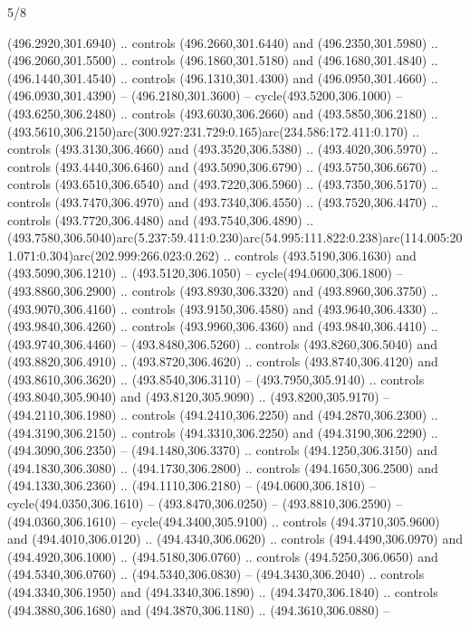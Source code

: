 \begin{flagdescription}{5/8}
\begin{scope}[xshift=0.5\flaglength,yshift=0.5\flagwidth,scale=\flagwidth/475.63]
\begin{scope}[y=0.8pt, x=0.8pt, yscale=-1, xscale=1,shift={(-450,-300)}]
\begin{scope}[cm={{1.0,0.0,0.0,1.0,(-0.0002,0.12556)}},cm={{1.0,0.0,0.0,1.0,(0.00179,0.0)}}]
\begin{scope}[cm={{1.11592,0.0,0.0,1.11592,(-106.89933,-41.77764)}}]
\begin{scope}[draw=black,fill=cfff]
\begin{scope}[fill=black]
  (496.2920,301.6940) .. controls (496.2660,301.6440) and (496.2350,301.5980) ..
  (496.2060,301.5500) .. controls (496.1860,301.5180) and (496.1680,301.4840) ..
  (496.1440,301.4540) .. controls (496.1310,301.4300) and (496.0950,301.4660) ..
  (496.0930,301.4390) -- (496.2180,301.3600) -- cycle(493.5200,306.1000) --
  (493.6250,306.2480) .. controls (493.6030,306.2660) and (493.5850,306.2180) ..
  (493.5610,306.2150)arc(300.927:231.729:0.165)arc(234.586:172.411:0.170) ..
  controls (493.3130,306.4660) and (493.3520,306.5380) .. (493.4020,306.5970) ..
  controls (493.4440,306.6460) and (493.5090,306.6790) .. (493.5750,306.6670) ..
  controls (493.6510,306.6540) and (493.7220,306.5960) .. (493.7350,306.5170) ..
  controls (493.7470,306.4970) and (493.7340,306.4550) .. (493.7520,306.4470) ..
  controls (493.7720,306.4480) and (493.7540,306.4890) ..
  (493.7580,306.5040)arc(5.237:59.411:0.230)arc(54.995:111.822:0.238)arc(114.005:201.071:0.304)arc(202.999:266.023:0.262)
  .. controls (493.5190,306.1630) and (493.5090,306.1210) .. (493.5120,306.1050)
  -- cycle(494.0600,306.1800) -- (493.8860,306.2900) .. controls
  (493.8930,306.3320) and (493.8960,306.3750) .. (493.9070,306.4160) .. controls
  (493.9150,306.4580) and (493.9640,306.4330) .. (493.9840,306.4260) .. controls
  (493.9960,306.4360) and (493.9840,306.4410) .. (493.9740,306.4460) --
  (493.8480,306.5260) .. controls (493.8260,306.5040) and (493.8820,306.4910) ..
  (493.8720,306.4620) .. controls (493.8740,306.4120) and (493.8610,306.3620) ..
  (493.8540,306.3110) -- (493.7950,305.9140) .. controls (493.8040,305.9040) and
  (493.8120,305.9090) .. (493.8200,305.9170) -- (494.2110,306.1980) .. controls
  (494.2410,306.2250) and (494.2870,306.2300) .. (494.3190,306.2150) .. controls
  (494.3310,306.2250) and (494.3190,306.2290) .. (494.3090,306.2350) --
  (494.1480,306.3370) .. controls (494.1250,306.3150) and (494.1830,306.3080) ..
  (494.1730,306.2800) .. controls (494.1650,306.2500) and (494.1330,306.2360) ..
  (494.1110,306.2180) -- (494.0600,306.1810) -- cycle(494.0350,306.1610) --
  (493.8470,306.0250) -- (493.8810,306.2590) -- (494.0360,306.1610) --
  cycle(494.3400,305.9100) .. controls (494.3710,305.9600) and
  (494.4010,306.0120) .. (494.4340,306.0620) .. controls (494.4490,306.0970) and
  (494.4920,306.1000) .. (494.5180,306.0760) .. controls (494.5250,306.0650) and
  (494.5340,306.0760) .. (494.5340,306.0830) -- (494.3430,306.2040) .. controls
  (494.3340,306.1950) and (494.3340,306.1890) .. (494.3470,306.1840) .. controls
  (494.3880,306.1680) and (494.3870,306.1180) .. (494.3610,306.0880) --

\end{scope}
\end{scope}
\end{scope}
\end{scope}
\end{scope}
\end{scope}
\end{flagdescription}
